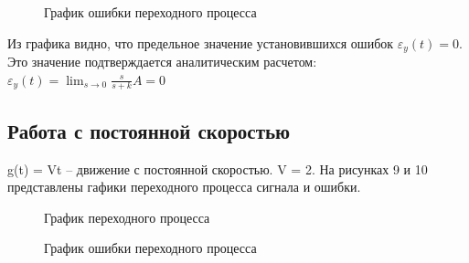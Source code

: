 \documentclass[a4paper, 11pt]{article}
\begin{document}
\newpage

\begin{figure}[h!]
    \caption{График ошибки переходного процесса}
    \label{tree}
\end{figure}

Из графика видно, что предельное значение установившихся ошибок $\varepsilon_y(t)=0$. Это значение подтверждается аналитическим расчетом: $\varepsilon_y(t)=\lim_{s\to0}\frac{s}{s+k}A=0$\\


\subsection{Работа с постоянной скоростью} g(t) = Vt – движение с постоянной скоростью. V = 2. На рисунках 9 и 10 представлены гафики переходного процесса сигнала и ошибки.


\begin{figure}[h!]
    \caption{График переходного процесса}
    \label{two}
\end{figure}

\newpage

\begin{figure}[h!]
    \caption{График ошибки переходного процесса}
    \label{tree}
\end{figure}
\end{document}

